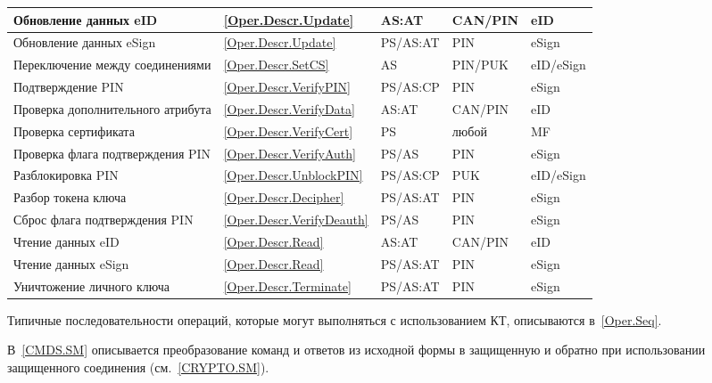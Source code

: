 \begin{table}[h!]
\begin{tabular}{|p{7.5cm}|p{1.3cm}|p{2.6cm}|p{1.8cm}| p{1.7cm}|}
\hline
Обновление данных eID & \ref{Oper.Descr.Update} & AS:AT & CAN/PIN & eID \\
\hline
Обновление данных eSign & \ref{Oper.Descr.Update} & PS/AS:AT & PIN & eSign \\
\hline
Переключение между соединениями & \ref{Oper.Descr.SetCS} & AS & PIN/PUK & 
eID/eSign \\ 
\hline
Подтверждение PIN & \ref{Oper.Descr.VerifyPIN} & PS/AS:CP & PIN & eSign \\
\hline
Проверка дополнительного атрибута& \ref{Oper.Descr.VerifyData}& AS:AT & CAN/PIN 
& eID \\ 
\hline
Проверка сертификата & \ref{Oper.Descr.VerifyCert} & PS & любой & MF \\
\hline
Проверка флага подтверждения PIN & \ref{Oper.Descr.VerifyAuth} & PS/AS & PIN 
& eSign \\ 
\hline
Разблокировка PIN & \ref{Oper.Descr.UnblockPIN} & PS/AS:CP  & PUK & eID/eSign\\ 
\hline
Разбор токена ключа & 
\ref{Oper.Descr.Decipher} & PS/AS:AT & PIN & eSign \\
\hline
Сброс флага подтверждения PIN & \ref{Oper.Descr.VerifyDeauth} & 
PS/AS & PIN & eSign \\ 
\hline
Чтение данных eID & \ref{Oper.Descr.Read} & AS:AT & CAN/PIN & eID \\
\hline
Чтение данных eSign & \ref{Oper.Descr.Read} & PS/AS:AT& PIN & eSign \\
\hline
Уничтожение личного ключа & \ref{Oper.Descr.Terminate} & PS/AS:AT  & PIN & eSign \\
\hline
\end{tabular}
\end{table}

Типичные последовательности операций, которые могут выполняться 
с использованием КТ, описываются в~\ref{Oper.Seq}.

В~\ref{CMDS.SM} описывается преобразование команд и ответов из исходной формы в 
защищенную и обратно при использовании защищенного соединения (см.~\ref{CRYPTO.SM}). 


